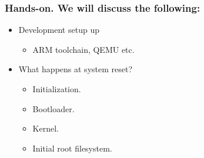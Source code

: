 \documentclass[11pt]{beamer}
\begin{document}
\begin{frame}[fragile]\frametitle{Hands-on. We will discuss the following:}
\label{sec-4.2}

\begin{itemize}

\item Development setup up\\
\label{sec-4.2.1}

\begin{itemize}

\item ARM toolchain, QEMU etc.\\
\label{sec-4.2.1.1}

\end{itemize} %

\item What happens at system reset?\\
\label{sec-4.2.2}

\begin{itemize}

\item Initialization.\\
\label{sec-4.2.2.1}


\item Bootloader.\\
\label{sec-4.2.2.2}


\item Kernel.\\
\label{sec-4.2.2.3}


\item Initial root filesystem.\\
\label{sec-4.2.2.4}


\end{itemize} %
\end{itemize} %
\end{frame}
\end{document}
